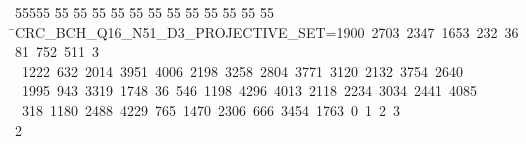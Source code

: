 %
%
\begin{tabbing}
55555 \= 55 \= 55 \= 55 \= 55 \= 55 \= 55 \= 55 \= 55 \= 55 \= 55 \= 55 \= 55 \= \>CRC\_BCH\_Q16\_N51\_D3\_PROJECTIVE\_SET=1900\ 2703\ 2347\ 1653\ 232\ 3681\ 752\ 511\ 3\\[0pt]
\ 1222\ 632\ 2014\ 3951\ 4006\ 2198\ 3258\ 2804\ 3771\ 3120\ 2132\ 3754\ 2640\\[0pt]
\>\ 1995\ 943\ 3319\ 1748\ 36\ 546\ 1198\ 4296\ 4013\ 2118\ 2234\ 3034\ 2441\ 4085\ \\[0pt]
\ 318\ 1180\ 2488\ 4229\ 765\ 1470\ 2306\ 666\ 3454\ 1763\ 0\ 1\ 2\ 3\ \\[0pt]
2\>\end{tabbing}
